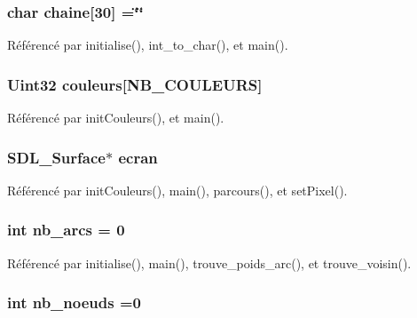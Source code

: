 \subsubsection[{chaine}]{\setlength{\rightskip}{0pt plus 5cm}char chaine[30] =\char`\"{}\char`\"{}}\label{dijkstra__malloc_8h_a340238bb970574aab1fe881a3deaa6d0}


Référencé par initialise(), int\+\_\+to\+\_\+char(), et main().

\subsubsection[{couleurs}]{\setlength{\rightskip}{0pt plus 5cm}Uint32 couleurs[{\bf N\+B\+\_\+\+C\+O\+U\+L\+E\+U\+RS}]}\label{dijkstra__malloc_8h_a025b11b0f1c015fd5b2c75ad56a7f8a7}


Référencé par init\+Couleurs(), et main().

\subsubsection[{ecran}]{\setlength{\rightskip}{0pt plus 5cm}S\+D\+L\+\_\+\+Surface$\ast$ ecran}\label{dijkstra__malloc_8h_ad7336f08728614cd400604d2ba6ca1ef}


Référencé par init\+Couleurs(), main(), parcours(), et set\+Pixel().

\subsubsection[{nb\+\_\+arcs}]{\setlength{\rightskip}{0pt plus 5cm}int nb\+\_\+arcs = 0}\label{dijkstra__malloc_8h_a11167be2abf61897c7c126efc14ebe67}


Référencé par initialise(), main(), trouve\+\_\+poids\+\_\+arc(), et trouve\+\_\+voisin().

\subsubsection[{nb\+\_\+noeuds}]{\setlength{\rightskip}{0pt plus 5cm}int nb\+\_\+noeuds =0}\label{dijkstra__malloc_8h_a573b137c526de2917404ff7ef7055adb}


